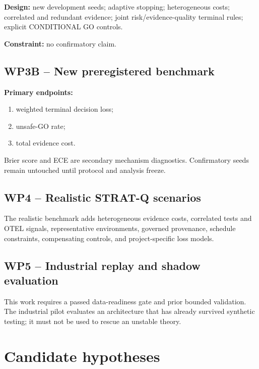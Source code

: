 \documentclass[11pt,a4paper]{report}
\begin{document}
\textbf{Design:} new development seeds; adaptive stopping; heterogeneous costs; correlated and redundant evidence; joint risk/evidence-quality terminal rules; explicit CONDITIONAL GO controls.

\textbf{Constraint:} no confirmatory claim.

\section{WP3B -- New preregistered benchmark}

\textbf{Primary endpoints:}
\begin{enumerate}
  \item weighted terminal decision loss;
  \item unsafe-GO rate;
  \item total evidence cost.
\end{enumerate}

Brier score and ECE are secondary mechanism diagnostics. Confirmatory seeds remain untouched until protocol and analysis freeze.

\section{WP4 -- Realistic STRAT-Q scenarios}

The realistic benchmark adds heterogeneous evidence costs, correlated tests and OTEL signals, representative environments, governed provenance, schedule constraints, compensating controls, and project-specific loss models.

\section{WP5 -- Industrial replay and shadow evaluation}

This work requires a passed data-readiness gate and prior bounded validation. The industrial pilot evaluates an architecture that has already survived synthetic testing; it must not be used to rescue an unstable theory.

\chapter{Candidate hypotheses}
\end{document}
